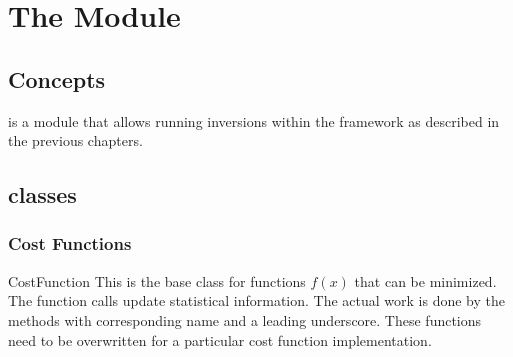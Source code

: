 
%
%
%

\chapter{The \downunder Module}\label{chap:ModuleRef}

\section{Concepts}
\downunder is a \python module that allows running inversions within the
\escript framework as described in the previous chapters.

\section{\downunder classes}

\subsection{Cost Functions}

\begin{classdesc}{CostFunction}{}
    This is the base class for functions $f(x)$ that can be minimized.
    The function calls update statistical information.
    The actual work is done by the methods with corresponding name and a
    leading underscore. These functions need to be overwritten for a particular
    cost function implementation.
\end{classdesc}

